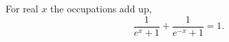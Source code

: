 \documentclass{article}
\begin{document}
For real $x$ the occupations add up,
\begin{equation}
\frac{1}{e^{x}+1} + \frac{1}{e^{-x}+1} = 1 .
\label{eq:ok}
\end{equation}
\end{document}
